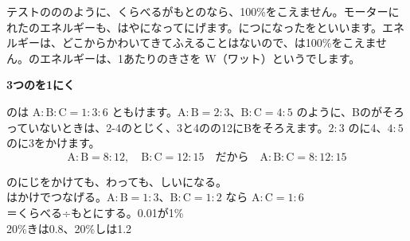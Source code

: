 テストのののように、くらべるがもとのなら、100\%をこえません。モーターにれたのエネルギーも、はやになってにげます。につになったを\textbf{}といいます。エネルギーは、どこからかわいてきてふえることはないので、は100\%をこえません。のエネルギーは、1あたりのきさを W（ワット）というでします。

\begin{motto}[2]
\textbf{3つのを1にく}\par
{}のは $\mathrm{A}:\mathrm{B}:\mathrm{C}=1:3:6$ ともけます。$\mathrm{A}:\mathrm{B}=2:3$、$\mathrm{B}:\mathrm{C}=4:5$ のように、Bのがそろっていないときは、2-4のとじく、3と4のの12にBをそろえます。$2:3$ のに4、$4:5$ のに3をかけます。
\[ \mathrm{A}:\mathrm{B}=8:12,\quad \mathrm{B}:\mathrm{C}=12:15\quad\text{だから}\quad \mathrm{A}:\mathrm{B}:\mathrm{C}=8:12:15 \]
\end{motto}

\begin{taisetsu}
のにじをかけても、わっても、しいになる。\\
はかけでつなげる。$\mathrm{A}:\mathrm{B}=1:3$、$\mathrm{B}:\mathrm{C}=1:2$ なら $\mathrm{A}:\mathrm{C}=1:6$\\
＝くらべる÷もとにする。0.01が1\%\\
20\%きは0.8、20\%しは1.2
\end{taisetsu}

\begin{kotoba}
\small
{}
\end{kotoba}

